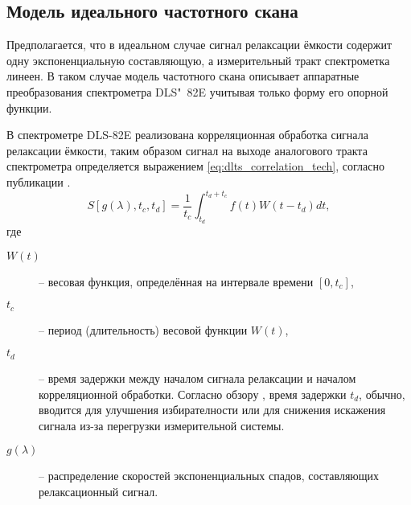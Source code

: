    \subsection{Модель идеального частотного скана}
    Предполагается, что в идеальном случае сигнал релаксации ёмкости содержит 
    одну экспоненциальную составляющую, а измерительный тракт спектрометка
    линеен. В таком случае модель частотного скана описывает аппаратные 
    преобразования спектрометра DLS"~82E учитывая только форму его опорной
    функции.

    В спектрометре DLS-82E реализована корреляционная обработка сигнала
    релаксации ёмкости, таким образом сигнал на выходе аналогового тракта
    спектрометра определяется выражением \ref{eq:dlts_correlation_tech},
    согласно публикации \cite{istratov_exp_analysis}.
    \begin{equation}
        \label{eq:dlts_correlation_tech}
        S\left[g(\lambda),t_c,t_d\right]=\frac{1}{t_c}\int_{t_d}^{t_d+t_c}
        f(t)W\left(t-t_d\right)dt ,
    \end{equation}
    где
    \begin{description}
        \item[$W(t)$] -- весовая функция, определённая на интервале 
        времени $\left[0,t_c\right]$,
        \item[$t_c$] -- период (длительность) весовой функции $W(t)$,
        \item[$t_d$] -- время задержки между началом сигнала релаксации
        и началом корреляционной обработки. Согласно обзору 
        \cite{istratov_exp_analysis}, время задержки $t_d$, обычно, 
        вводится для улучшения избирателности или для снижения искажения
        сигнала из-за перегрузки измерительной системы.
        \item[$g(\lambda)$] -- распределение скоростей экспоненциальных
        спадов, составляющих релаксационный сигнал.
    \end{description}


